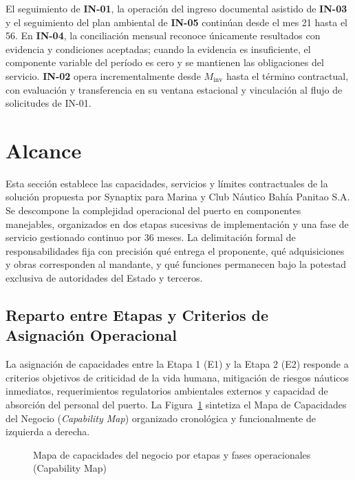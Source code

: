\begin{itemize}
    El seguimiento de \textbf{IN-01}, la operación del ingreso documental asistido de \textbf{IN-03} y el seguimiento del plan ambiental de \textbf{IN-05} continúan desde el mes 21 hasta el 56. En \textbf{IN-04}, la conciliación mensual reconoce únicamente resultados con evidencia y condiciones aceptadas; cuando la evidencia es insuficiente, el componente variable del período es cero y se mantienen las obligaciones del servicio. \textbf{IN-02} opera incrementalmente desde $M_{\mathrm{inv}}$ hasta el término contractual, con evaluación y transferencia en su ventana estacional y vinculación al flujo de solicitudes de IN-01.
\end{itemize}

\newpage

\section{Alcance}

Esta sección establece las capacidades, servicios y límites contractuales de la solución propuesta por Synaptix para Marina y Club Náutico Bahía Panitao S.A. Se descompone la complejidad operacional del puerto en componentes manejables, organizados en dos etapas sucesivas de implementación y una fase de servicio gestionado continuo por 36 meses. La delimitación formal de responsabilidades fija con precisión qué entrega el proponente, qué adquisiciones y obras corresponden al mandante, y qué funciones permanecen bajo la potestad exclusiva de autoridades del Estado y terceros.

\subsection{Reparto entre Etapas y Criterios de Asignación Operacional}

La asignación de capacidades entre la Etapa 1 (E1) y la Etapa 2 (E2) responde a criterios objetivos de criticidad de la vida humana, mitigación de riesgos náuticos inmediatos, requerimientos regulatorios ambientales externos y capacidad de absorción del personal del puerto. La Figura~\ref{fig:capability_map} sintetiza el Mapa de Capacidades del Negocio (\emph{Capability Map}) organizado cronológica y funcionalmente de izquierda a derecha.

\begin{figure}[H]
    \centering
    
    \caption{Mapa de capacidades del negocio por etapas y fases operacionales (Capability Map)}
    \label{fig:capability_map}
\end{figure}

